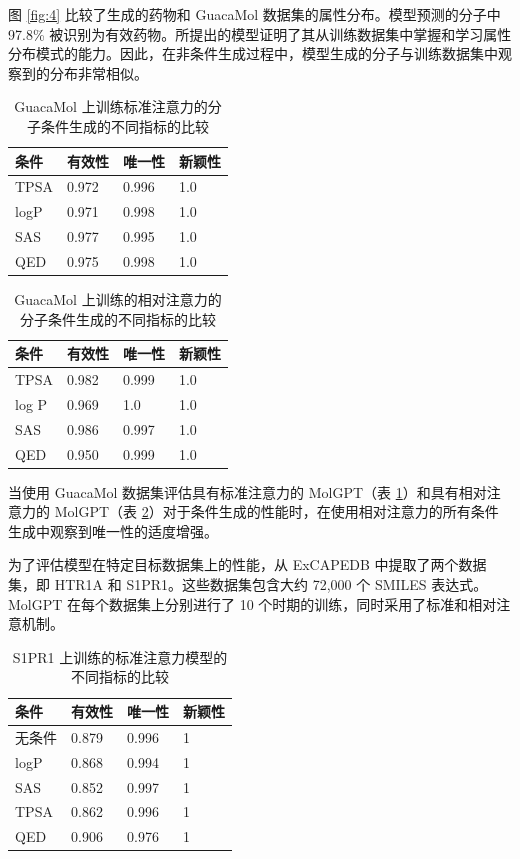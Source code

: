 图 \ref{fig:4} 比较了生成的药物和 GuacaMol 数据集的属性分布。模型预测的分子中 97.8\% 被识别为有效药物。所提出的模型证明了其从训练数据集中掌握和学习属性分布模式的能力。因此，在非条件生成过程中，模型生成的分子与训练数据集中观察到的分布非常相似。

\begin{table}[H]
  \centering
  \caption{GuacaMol 上训练标准注意力的分子条件生成的不同指标的比较}
  \label{tab:3}
  \begin{tabular}{llll}
    \hline 条件 & 有效性 & 唯一性 & 新颖性 \\
    \hline TPSA & 0.972 & 0.996 & 1.0 \\
    logP  & 0.971 & 0.998 & 1.0 \\
    SAS  & 0.977 & 0.995 & 1.0 \\
    QED  & 0.975 & 0.998 & 1.0 \\
    \hline
    \end{tabular}
\end{table}

\begin{table}[H]
  \centering
  \caption{GuacaMol 上训练的相对注意力的分子条件生成的不同指标的比较}
  \label{tab:4}
  \begin{tabular}{llll}
    \hline 条件 & 有效性 & 唯一性 & 新颖性 \\
      \hline TPSA  & 0.982 & 0.999 & 1.0 \\
      log  P  & 0.969 & 1.0 & 1.0 \\
      SAS  & 0.986 & 0.997 & 1.0 \\
      QED  & 0.950 & 0.999 & 1.0 \\
      \hline
    \end{tabular}
\end{table}

当使用 GuacaMol 数据集评估具有标准注意力的 MolGPT（表 \ref{tab:3}）和具有相对注意力的 MolGPT（表 \ref{tab:4}）对于条件生成的性能时，在使用相对注意力的所有条件生成中观察到唯一性的适度增强。

为了评估模型在特定目标数据集上的性能，从 ExCAPEDB 中提取了两个数据集，即 HTR1A 和 S1PR1。这些数据集包含大约 72,000 个 SMILES 表达式。 MolGPT 在每个数据集上分别进行了 10 个时期的训练，同时采用了标准和相对注意机制。

\begin{table}[H]
  \centering
  \caption{S1PR1 上训练的标准注意力模型的不同指标的比较}
  \label{tab:5}
  \begin{tabular}{llll}
    \hline 条件 & 有效性 & 唯一性 & 新颖性 \\
    \hline 无条件 & 0.879 & 0.996 & 1 \\
    logP & 0.868 & 0.994 & 1 \\
    SAS & 0.852 & 0.997 & 1 \\
    TPSA & 0.862 & 0.996 & 1 \\
    QED & 0.906 & 0.976 & 1 \\
    \hline
    \end{tabular}
\end{table}


